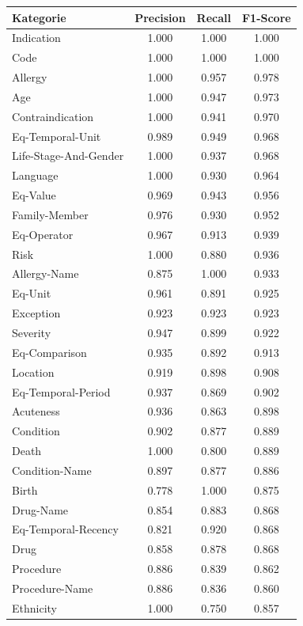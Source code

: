 \begin{table}[htbp]
\centering
\begin{tabular}{p{5cm}ccc}
\toprule
\textbf{Kategorie} & \textbf{Precision} & \textbf{Recall} & \textbf{F1-Score} \\
\midrule
Indication & 1.000 & 1.000 & 1.000 \\
Code & 1.000 & 1.000 & 1.000 \\
Allergy & 1.000 & 0.957 & 0.978 \\
Age & 1.000 & 0.947 & 0.973 \\
Contraindication & 1.000 & 0.941 & 0.970 \\
Eq-Temporal-Unit & 0.989 & 0.949 & 0.968 \\
Life-Stage-And-Gender & 1.000 & 0.937 & 0.968 \\
Language & 1.000 & 0.930 & 0.964 \\
Eq-Value & 0.969 & 0.943 & 0.956 \\
Family-Member & 0.976 & 0.930 & 0.952 \\
Eq-Operator & 0.967 & 0.913 & 0.939 \\
Risk & 1.000 & 0.880 & 0.936 \\
Allergy-Name & 0.875 & 1.000 & 0.933 \\
Eq-Unit & 0.961 & 0.891 & 0.925 \\
Exception & 0.923 & 0.923 & 0.923 \\
Severity & 0.947 & 0.899 & 0.922 \\
Eq-Comparison & 0.935 & 0.892 & 0.913 \\
Location & 0.919 & 0.898 & 0.908 \\
Eq-Temporal-Period & 0.937 & 0.869 & 0.902 \\
Acuteness & 0.936 & 0.863 & 0.898 \\
Condition & 0.902 & 0.877 & 0.889 \\
Death & 1.000 & 0.800 & 0.889 \\
Condition-Name & 0.897 & 0.877 & 0.886 \\
Birth & 0.778 & 1.000 & 0.875 \\
Drug-Name & 0.854 & 0.883 & 0.868 \\
Eq-Temporal-Recency & 0.821 & 0.920 & 0.868 \\
Drug & 0.858 & 0.878 & 0.868 \\
Procedure & 0.886 & 0.839 & 0.862 \\
Procedure-Name & 0.886 & 0.836 & 0.860 \\
Ethnicity & 1.000 & 0.750 & 0.857 \\

\end{tabular}
\end{table}
